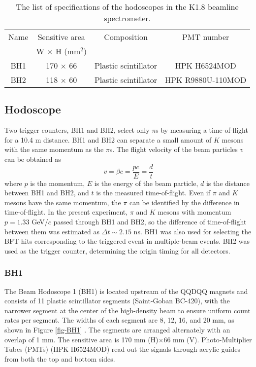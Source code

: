 
\begin{table}[h]
  \begin{center}
    \caption{The list of specifications of the hodoscopes in the K1.8 beamline spectrometer.}
    \begin{tabular}{cccc} \hline \hline
      Name & Sensitive area & Composition & PMT number \\
       & W $\times$ H (mm$^2$) & & \\ \hline
      BH1& 170 $\times$ 66 & Plastic scintillator & HPK H6524MOD \\
      BH2 & 118 $\times$ 60 & Plastic scintillator & HPK R9880U-110MOD  \\ 
\hline\hline
   \end{tabular}
   \label{tab-K1.8spec-hodo}
   \end{center}
\end{table}

\subsection{Hodoscope}
Two trigger counters, BH1 and BH2, select only $\pi$s by measuring a time-of-flight for a 10.4 m distance. BH1 and BH2 can separate a small amount of $K$ mesons with the same momentum as the $\pi$s. The flight velocity of the beam particles $v$ can be obtained as
\begin{equation}
  v = \beta c = \frac{pc}{E} = \frac{d}{t}
  \label{eq:velo}
\end{equation}
where $p$ is the momentum, $E$ is the energy of the beam particle, $d$ is the distance between BH1 and BH2, and $t$ is the measured time-of-flight. Even if $\pi$ and $K$ mesons have the same momentum, the $\pi$ can be identified by the difference in time-of-flight. In the present experiment, $\pi$ and $K$ mesons with momentum $p = 1.33$ GeV/$c$ passed through BH1 and BH2, so the difference of time-of-flight between them was estimated as $\Delta t \sim 2.15$ ns. BH1 was also used for selecting the BFT hits corresponding to the triggered event in multiple-beam events. BH2 was used as the trigger counter, determining the origin timing for all detectors.

\subsubsection{BH1}
The Beam Hodoscope 1 (BH1) \cite{BH1} is located upstream of the QQDQQ magnets and consists of 11 plastic scintillator segments (Saint-Goban BC-420), with the narrower segment at the center of the high-density beam to ensure uniform count rates per segment. The widths of each segment are 8, 12, 16, and 20 mm, as shown in Figure \ref{fig-BH1} \cite{Honda-D}. The segments are arranged alternately with an overlap of 1 mm. The sensitive area is 170 mm (H)$\times$66 mm (V). Photo-Multiplier Tubes (PMTs) (HPK H6524MOD) read out the signals through acrylic guides from both the top and bottom sides.

